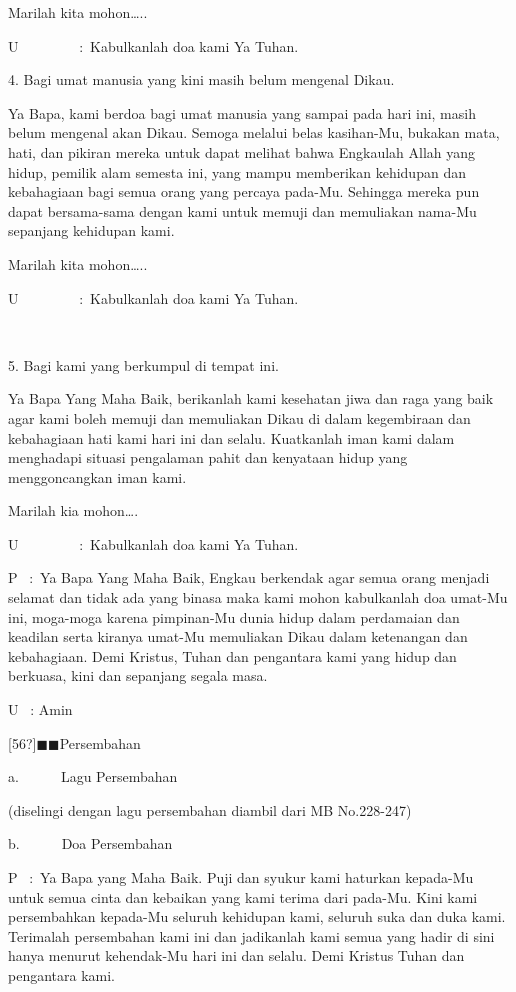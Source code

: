 \documentclass{article}
\begin{document}
Marilah kita mohon{\dots}..

U~~~~~~~~ :~Kabulkanlah doa kami Ya Tuhan.

4. Bagi umat manusia yang kini masih belum mengenal Dikau.

Ya Bapa, kami berdoa bagi umat manusia yang sampai pada hari ini, masih belum mengenal akan Dikau. Semoga melalui belas
kasihan-Mu, bukakan mata, hati, dan pikiran mereka untuk dapat melihat bahwa Engkaulah Allah yang hidup, pemilik alam
semesta ini, yang mampu memberikan kehidupan dan kebahagiaan bagi semua orang yang percaya pada-Mu. Sehingga mereka pun
dapat bersama-sama dengan kami untuk memuji dan memuliakan nama-Mu sepanjang kehidupan kami.

Marilah kita mohon{\dots}..

U~~~~~~~~ :~Kabulkanlah doa kami Ya Tuhan.

~~~~~~~~~~~~~~~~~~~~~~~~~~~~~~~~~~~~~~~~~~~~~~~

5. Bagi kami yang berkumpul di tempat ini.

Ya Bapa Yang Maha Baik, berikanlah kami kesehatan jiwa dan raga yang baik agar kami boleh memuji dan memuliakan Dikau di
dalam kegembiraan dan kebahagiaan hati kami hari ini dan selalu. Kuatkanlah iman kami dalam menghadapi situasi
pengalaman pahit dan kenyataan hidup yang menggoncangkan iman kami.

Marilah kia mohon{\dots}.

U~~~~~~~~ :~Kabulkanlah doa kami Ya Tuhan.

P~ :~Ya Bapa Yang Maha Baik, Engkau berkendak agar semua orang menjadi selamat dan tidak ada yang binasa maka kami mohon
kabulkanlah doa umat-Mu ini, moga-moga karena pimpinan-Mu dunia hidup dalam perdamaian dan keadilan serta kiranya
umat-Mu memuliakan Dikau dalam ketenangan dan kebahagiaan. Demi Kristus, Tuhan dan pengantara kami yang hidup dan
berkuasa, kini dan sepanjang segala masa.

U~ : Amin

[56?]${\blacksquare}{\blacksquare}$Persembahan

a.~~~~~~Lagu Persembahan

(diselingi dengan lagu persembahan diambil dari MB No.228-247)

b.~~~~~~Doa Persembahan

P~ :~Ya Bapa yang Maha Baik. Puji dan syukur kami haturkan kepada-Mu untuk semua cinta dan kebaikan yang kami terima
dari pada-Mu. Kini kami persembahkan kepada-Mu seluruh kehidupan kami, seluruh suka dan duka kami. Terimalah
persembahan kami ini dan jadikanlah kami semua yang hadir di sini hanya menurut kehendak-Mu hari ini dan selalu. Demi
Kristus Tuhan dan pengantara kami.
\end{document}
